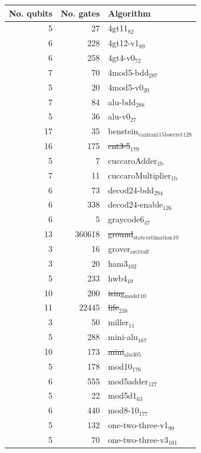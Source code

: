\begin{center}
\begin{tabular}{rrl}
No. qubits & No. gates & Algorithm\\
\hline
5 & 27 & 4gt11\(_{\text{82}}\)\\
6 & 228 & 4gt12-v1\(_{\text{89}}\)\\
6 & 258 & 4gt4-v0\(_{\text{72}}\)\\
7 & 70 & 4mod5-bdd\(_{\text{287}}\)\\
5 & 20 & 4mod5-v0\(_{\text{20}}\)\\
7 & 84 & alu-bdd\(_{\text{288}}\)\\
5 & 36 & alu-v0\(_{\text{27}}\)\\
17 & 35 & benstein\(_{\text{vazirani}}\)\(_{\text{15b}}\)\(_{\text{secret}}\)\(_{\text{128}}\)\\
16 & 175 & \sout{cnt3-5\(_{\text{179}}\)}\\
5 & 7 & cuccaroAdder\(_{\text{1b}}\)\\
7 & 11 & cuccaroMultiplier\(_{\text{1b}}\)\\
6 & 73 & decod24-bdd\(_{\text{294}}\)\\
6 & 338 & decod24-enable\(_{\text{126}}\)\\
6 & 5 & graycode6\(_{\text{47}}\)\\
13 & 360618 & \sout{ground\(_{\text{state}}\)\(_{\text{estimation}}\)\(_{\text{10}}\)}\\
3 & 16 & grover\(_{\text{orcl}}\)\(_{\text{toff}}\)\\
3 & 20 & ham3\(_{\text{102}}\)\\
5 & 233 & hwb4\(_{\text{49}}\)\\
10 & 200 & \sout{ising\(_{\text{model}}\)\(_{\text{10}}\)}\\
11 & 22445 & \sout{life\(_{\text{238}}\)}\\
3 & 50 & miller\(_{\text{11}}\)\\
5 & 288 & mini-alu\(_{\text{167}}\)\\
10 & 173 & \sout{mini\(_{\text{alu}}\)\(_{\text{305}}\)}\\
5 & 178 & mod10\(_{\text{176}}\)\\
6 & 555 & mod5adder\(_{\text{127}}\)\\
5 & 22 & mod5d1\(_{\text{63}}\)\\
6 & 440 & mod8-10\(_{\text{177}}\)\\
5 & 132 & one-two-three-v1\(_{\text{99}}\)\\
5 & 70 & one-two-three-v3\(_{\text{101}}\)\\

\end{tabular}
\end{center}

